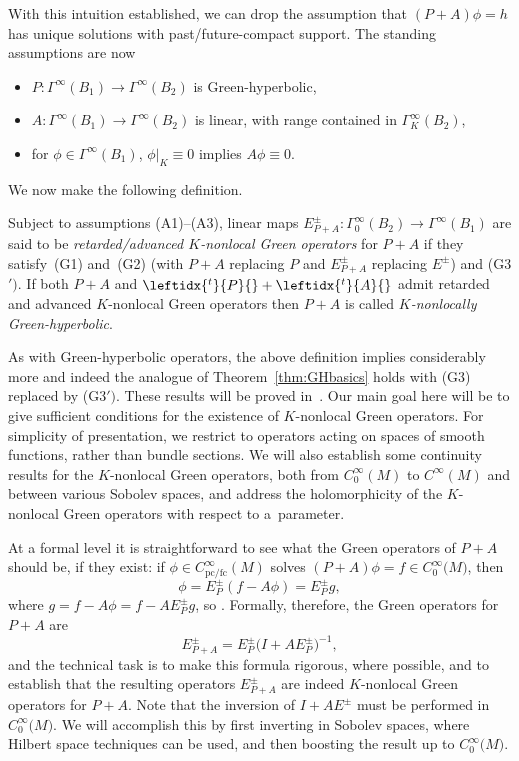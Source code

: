 \documentclass[pdftex]{sigma}
\numberwithin{equation}{section}
\newcommand{\CoinX}[1]{C_0^\infty\big({#1}\big)}
\newcommand{\GoinX}[1]{\Gamma_0^\infty({#1})}
\newcommand{\fc}{\mathrm{fc}}
\newcommand{\pc}{\mathrm{pc}}
\newcommand{\adj}[1]{\leftidx{^{t}}{#1}{}}
\begin{document}
 With this intuition established, we can drop the assumption that $(P+A)\phi=h$ has unique solutions with past/future-compact support. The standing assumptions are now
 \begin{itemize}
 	\item[(A1)] $P\colon\Gamma^\infty(B_1)\to \Gamma^\infty(B_2)$ is Green-hyperbolic,
 	\item[(A2)] $A\colon\Gamma^\infty(B_1)\to \Gamma^\infty(B_2)$ is linear, with range contained in $\Gamma^\infty_K(B_2)$,
 	\item[(A3)] for $\phi\in \Gamma^\infty(B_1)$, $\phi|_K\equiv 0$ implies $A\phi\equiv 0$.
 \end{itemize}
 We now make the following definition.
 \begin{Definition}\label{def:KnonlocalGops}
 	Subject to assumptions (A1)--(A3), linear maps $E_{P+A}^{\pm}\colon\GoinX{B_2}\to \Gamma^\infty(B_1)$ are said to be \emph{retarded/advanced $K$-nonlocal Green operators} for $P+A$ if they satisfy~(G1) and~(G2) \big(with $P+A$ replacing $P$ and $E_{P+A}^\pm$ replacing $E^\pm$\big) and (G3${}')$. If both $P+A$ and $\adj{P}+\adj{A}$ admit retarded and advanced $K$-nonlocal Green operators then $P+A$ is called \emph{$K$-nonlocally Green-hyperbolic}.
 \end{Definition}



 As with Green-hyperbolic operators, the above definition implies considerably more and indeed the analogue of Theorem~\ref{thm:GHbasics} holds with (G3) replaced by (G3${}')$. These results will be proved in~\cite{FewVer:20xx}. Our main goal here will be to give sufficient
 conditions for the existence of $K$-nonlocal Green operators. For simplicity of presentation, we restrict to operators acting on spaces of smooth functions, rather than bundle sections. We will also establish some continuity results for the $K$-nonlocal Green operators, both from $C_0^\infty(M)$ to $C^\infty(M)$ and between various Sobolev spaces, and address the
 holomorphicity of the $K$-nonlocal Green operators with respect to a~parameter.

 At a formal level it is straightforward to see what the Green operators of $P+A$ should be, if they exist: if
 $\phi\in C^\infty_{\pc/\fc}(M)$ solves $(P+A)\phi=f\in \CoinX{M}$, then
 \begin{equation*}
 	\phi = E_P^\pm (f- A\phi) = E^\pm_{P} g,
 \end{equation*}
 where $g=f - A \phi= f- AE_P^\pm g$, so . Formally, therefore, the Green operators for $P+A$ are
 \begin{equation}\label{eq:formalGF}
 	E_{P+A}^\pm = E_P^\pm \big(I+AE^\pm_{P}\big)^{-1},
 \end{equation}
 and the technical task is to make this formula rigorous, where possible, and to establish that the resulting operators $E_{P+A}^\pm$ are indeed $K$-nonlocal Green operators for $P+A$. Note that the inversion of $I+AE^\pm$ must be performed in $\CoinX{M}$. We will accomplish this by first inverting in Sobolev spaces, where Hilbert space techniques can be used, and then boosting the result up to $\CoinX{M}$.
\end{document}
